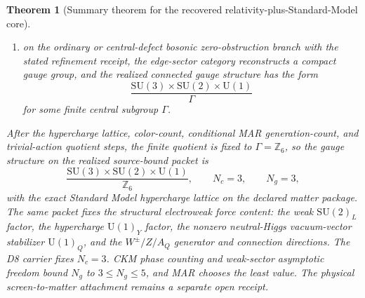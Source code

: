 \documentclass[11pt]{article}
\newtheorem{theorem}{Theorem}[section]
\newcommand{\SU}{\mathrm{SU}}
\newcommand{\U}{\mathrm{U}}
\begin{document}
\begin{theorem}[Summary theorem for the recovered relativity-plus-Standard-Model core]
\begin{enumerate}[label=(\roman*),leftmargin=2em]
\[
\delta\!\left(G_{00}+\Lambda g_{00}\right)=8\pi G\,\delta\langle T_{00}\rangle
\]
at the cap center in the diamond rest frame; if that rest-frame relation holds for all local directions and reference states in the scaling regime, then the timelike polarization upgrade gives
\[
\delta\!\left(G_{ab}+\Lambda g_{ab}
-8\pi G\,\langle T_{ab}\rangle\right)=0.
\]
The absolute equation requires the common-domain, uniform-asymptotic,
universal-coupling, vacuum-reference, and scale premises of
Theorem~\ref{thm:einstein-branch-entry-composed}; those premises are not
assumptions of this summary theorem;
\item on the ordinary or central-defect bosonic zero-obstruction branch with the stated refinement receipt, the edge-sector category reconstructs a compact gauge group, and the realized connected gauge structure has the form
\[
\frac{\SU(3)\times\SU(2)\times\U(1)}{\Gamma}
\]
for some finite central subgroup \(\Gamma\).
\end{enumerate}
After the hypercharge lattice, color-count, conditional MAR generation-count, and trivial-action quotient steps, the finite quotient is fixed to \(\Gamma=\mathbb Z_6\), so the gauge structure on the realized source-bound packet is
\[
\frac{\SU(3)\times\SU(2)\times\U(1)}{\mathbb Z_6},
\qquad
N_c=3,
\qquad
N_g=3,
\]
with the exact Standard Model hypercharge lattice on the declared matter package. The same packet fixes the structural electroweak force content: the weak \(\SU(2)_L\) factor, the hypercharge \(\U(1)_Y\) factor, the nonzero neutral-Higgs vacuum-vector stabilizer \(\U(1)_Q\), and the \(W^\pm/Z/A_Q\) generator and connection directions. The D8 carrier fixes \(N_c=3\). CKM phase counting and weak-sector asymptotic freedom bound \(N_g\) to \(3\le N_g\le5\), and MAR chooses the least value. The physical screen-to-matter attachment remains a separate open receipt.
\end{theorem}
\end{document}
